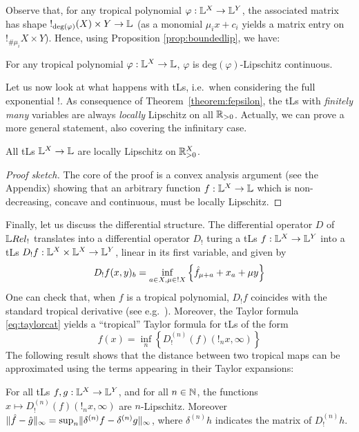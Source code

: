 Observe that, for any tropical polynomial $\varphi:\mathbb{L}^{X}\to \mathbb{L}^{Y}$, the associated matrix has shape $!_{\mathrm{deg}(\varphi)}(X)\times Y\to \mathbb{L}$ (as a monomial $\mu_ix+c_{i}$ yields a matrix entry on $!_{\#\mu_i}X\times Y$). Hence, using Proposition \ref{prop:boundedlip}, we have:
\begin{corollary}\label{prop:polylip}
For any tropical polynomial $\varphi:\mathbb{L}^{X}\to\mathbb{L}$, $\varphi$ is $\mathrm{deg}(\varphi)$-Lipschitz continuous.
\end{corollary}

Let us now look at what happens with tLs, i.e.~when considering the full exponential $!$.
As consequence of Theorem~\ref{theorem:fepsilon}, the tLs with \emph{finitely many} variables are always \emph{locally} Lipschitz on all $\mathbb{R}_{>0}$.
Actually, we can prove a more general statement, also covering the infinitary case.


\begin{theorem}\label{thmTLSlocLip}
 All tLs $\mathbb{L}^X\to\mathbb{L}$ are locally Lipschitz on $\mathbb{R}_{>0}^X$.
\end{theorem}
\begin{proof}[Proof sketch]
The core of the proof is a convex analysis argument (see the Appendix) showing that an arbitrary function $f:\mathbb{L}^X\to\mathbb{L}$ which is non-decreasing, concave and continuous, must be locally Lipschitz. 
\end{proof}


Finally, let us discuss the differential structure. The differential operator $D$ of $\LREL_{!}$ translates into a differential operator $D_{!}$ turing a tLs $f:\mathbb{L}^{X}\to \mathbb{L}^{Y}$ into a tLs $D_{!}f:\mathbb{L}^{X}\times \mathbb{L}^{X}\to \mathbb{L}^{Y}$, linear in its first variable, and given by 
\begin{equation}
D_{!}f(x,y)_{b}=\inf_{a\in X, \mu\in !X}\left\{\hat{f}_{\mu+a}+x_{a}+\mu y\right\}
\end{equation}
One can check that, when $f$ is a tropical polynomial, $D_{!}f$ coincides with the standard tropical derivative (see e.g.~\cite{Grigoriev2017}).
Moreover, the Taylor formula \eqref{eq:taylorcat} yields a ``tropical'' Taylor formula for tLs of the form 
\begin{equation}
f(x)=\inf_{n}\left\{D_{!}^{(n)}(f)(!_{n}x,\infty)\right\}
\end{equation}
The following result shows that the distance between two tropical maps can be approximated using the terms appearing in their Taylor expansions:
\begin{proposition}
For all tLs $f,g: \mathbb{L}^{X}\to \mathbb{L}^{Y}$, and for all $n\in \mathbb{N}$, 
the functions $x\mapsto D_{!}^{(n)}(f)(!_{n}x,\infty)$ are $n$-Lipschitz. Moreover 
$\lVert \hat{f}-\hat{g}\rVert_{\infty}= \sup_{n} \lVert {\delta^{(n)}f}- {\delta^{(n)}g}\rVert_{\infty}$, 
where $\delta^{(n)}h$ indicates the matrix of $D_{!}^{(n)}h$.
\end{proposition} 

